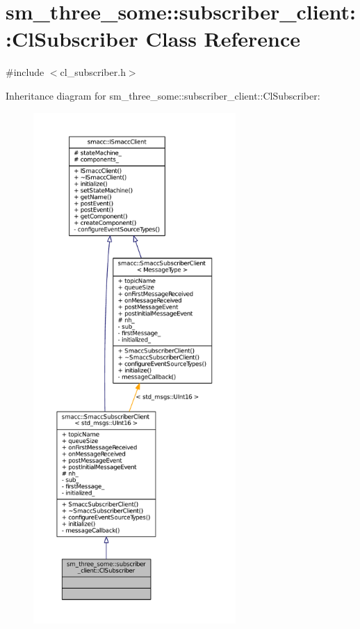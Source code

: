 \hypertarget{classsm__three__some_1_1subscriber__client_1_1ClSubscriber}{}\section{sm\+\_\+three\+\_\+some\+:\+:subscriber\+\_\+client\+:\+:Cl\+Subscriber Class Reference}
\label{classsm__three__some_1_1subscriber__client_1_1ClSubscriber}


{\ttfamily \#include $<$cl\+\_\+subscriber.\+h$>$}



Inheritance diagram for sm\+\_\+three\+\_\+some\+:\+:subscriber\+\_\+client\+:\+:Cl\+Subscriber\+:
\nopagebreak
\begin{figure}[H]
\begin{center}
\leavevmode
\includegraphics[height=550pt]{classsm__three__some_1_1subscriber__client_1_1ClSubscriber__inherit__graph}
\end{center}
\end{figure}


